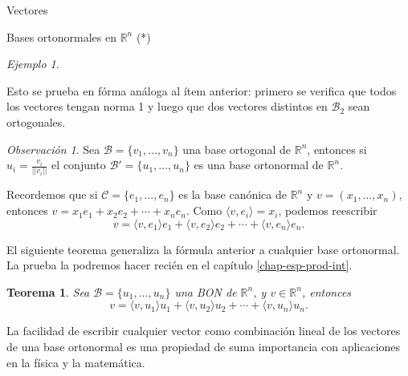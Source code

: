 \documentclass[a4paper,12pt,twoside,spanish,reqno]{amsbook}
\numberwithin{equation}{section}
\newtheorem{teorema}{Teorema}[section]
\theoremstyle{definition}
\theoremstyle{remark}
\newtheorem*{ejemplo*}{Ejemplo}
\newtheorem*{obs*}{Observaci\'on}
\newcommand{\la}{\langle}
\newcommand{\ra}{\rangle}
\newcommand{\R}{\mathbb R}
\begin{document}
\begin{chapter}{Vectores}
\begin{section}{Bases ortonormales en $\R^n$ (*)}
\begin{ejemplo*}
\begin{enumerate}
            Esto se prueba en fórma análoga al ítem anterior: primero se verifica que todos los vectores tengan norma 1  y luego que dos vectores distintos en $\mathcal B_2$ sean ortogonales.
        \end{enumerate}
    \end{ejemplo*}

    \begin{obs*}
        Sea  $\mathcal B =\{v_1,\ldots,v_n\}$ una base ortogonal de $\R^n$,  entonces si $u_i = \displaystyle\frac{v_i}{||v_i||}$ el conjunto $\mathcal B' =\{u_1,\ldots,u_n\}$ es una base ortonormal de $\R^n$. 
    \end{obs*}

   
    
    Recordemos que si $\mathcal C= \{e_1,\ldots,e_n\}$ es la base canónica de $\R^n$ y $v =(x_1,\ldots,x_n)$,  entonces 
    $v = x_1 e_1 + x_2 e_2 + \cdots + x_n e_n$. Como $\la v,e_i\ra = x_i$, podemos reescribir 
    \begin{equation*}
        v = \la v,e_1\ra e_1 +\la v,e_2\ra e_2 +\cdots+\la v,e_n\ra e_n.
    \end{equation*} 
    
    
    El siguiente teorema generaliza la fórmula  anterior a cualquier base ortonormal. La prueba la podremos hacer recién en el capítulo \ref{chap-esp-prod-int}.

    \begin{teorema}
        Sea $\mathcal B =\{u_1,\ldots,u_n\}$ una BON de $\R^n$, y $v \in \R^n$, entonces
        \begin{equation*}
            v = \la v,u_1\ra u_1 +\la v,u_2\ra u_2 +\cdots+\la v,u_n\ra u_n. \tag*{\qed}
        \end{equation*} 
    \end{teorema}
    
    La facilidad de escribir cualquier vector como combinación lineal de los vectores de una base ortonormal  es una propiedad de suma importancia con aplicaciones en la física y la matemática. 


\end{section}
\end{chapter}
\end{document}
